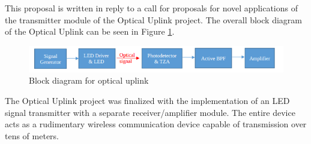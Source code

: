 




\noindent This proposal is written in reply to a call for proposals for novel applications of the transmitter module of the Optical Uplink project. The overall block diagram of the Optical Uplink can be seen in Figure \ref{fig:blockdiagram2}.


\begin{figure}[H]
    \centering
    \includegraphics[width=.9\textwidth ]{Introduction/blockdiagram}
    \caption{Block diagram for optical uplink \cite{b1}}
    \label{fig:blockdiagram2}
\end{figure}

The Optical Uplink project was finalized with the implementation of an LED signal transmitter with a separate receiver/amplifier module. The entire device acts as a rudimentary wireless communication device capable of transmission over tens of meters.





